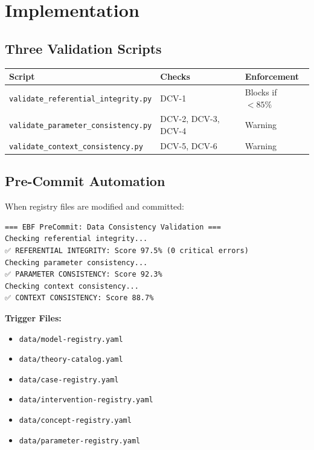 \section{Implementation}
\label{sec:vc-implementation}

\subsection{Three Validation Scripts}

\begin{center}
\begin{tabular}{lll}
\toprule
\textbf{Script} & \textbf{Checks} & \textbf{Enforcement} \\
\midrule
\texttt{validate\_referential\_integrity.py} & DCV-1 & Blocks if $< 85\%$ \\
\texttt{validate\_parameter\_consistency.py} & DCV-2, DCV-3, DCV-4 & Warning \\
\texttt{validate\_context\_consistency.py} & DCV-5, DCV-6 & Warning \\
\bottomrule
\end{tabular}
\end{center}

\subsection{Pre-Commit Automation}

When registry files are modified and committed:

\begin{verbatim}
=== EBF PreCommit: Data Consistency Validation ===
Checking referential integrity...
✅ REFERENTIAL INTEGRITY: Score 97.5% (0 critical errors)
Checking parameter consistency...
✅ PARAMETER CONSISTENCY: Score 92.3%
Checking context consistency...
✅ CONTEXT CONSISTENCY: Score 88.7%
\end{verbatim}

\textbf{Trigger Files:}
\begin{itemize}
    \item \texttt{data/model-registry.yaml}
    \item \texttt{data/theory-catalog.yaml}
    \item \texttt{data/case-registry.yaml}
    \item \texttt{data/intervention-registry.yaml}
    \item \texttt{data/concept-registry.yaml}
    \item \texttt{data/parameter-registry.yaml}
\end{itemize}

